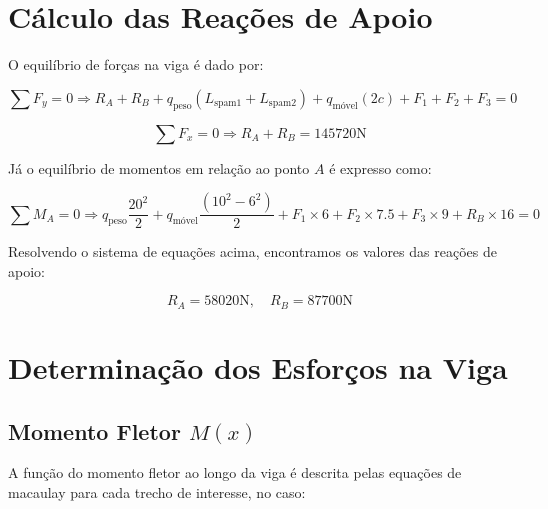 \section{Cálculo das Reações de Apoio}
O equilíbrio de forças na viga é dado por:

\begin{equation}
    \sum F_y = 0 \Rightarrow R_A + R_B + q_{\text{peso}} (L_{\text{spam1}} + L_{\text{spam2}}) + q_{\text{móvel}} (2c) + F_1 + F_2 + F_3 = 0
\end{equation}

\begin{equation}
    \sum F_x = 0 \Rightarrow R_A + R_B =145720 \text{N}
\end{equation}

Já o equilíbrio de momentos em relação ao ponto \( A \) é expresso como:

\begin{equation}
    \sum M_A = 0 \Rightarrow q_{\text{peso}} \frac{20^2}{2} + q_{\text{móvel}} \frac{(10^2 - 6^2)}{2} + F_1 \times 6 + F_2 \times 7.5 + F_3 \times 9 + R_B \times 16 = 0
\end{equation}

Resolvendo o sistema de equações acima, encontramos os valores das reações de apoio:

\begin{equation}
    R_A = 58020 \text{N}, \quad R_B = 87700\text{N}
\end{equation}


\section{Determinação dos Esforços na Viga}

\subsection{Momento Fletor \( M(x) \)}
A função do momento fletor ao longo da viga é descrita pelas equações de macaulay para cada trecho de interesse, no caso:


